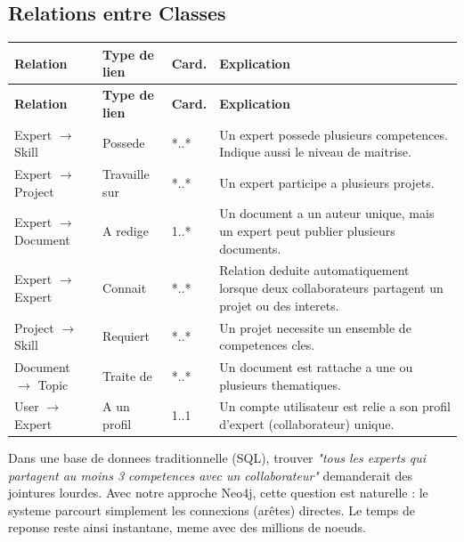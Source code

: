 \documentclass[12pt,a4paper]{article}
\begin{document}
\subsection{Relations entre Classes}

\begin{longtable}{|p{3.5cm}|p{3cm}|p{1.5cm}|p{5.5cm}|}
\toprule
\rowcolor{bleu!15}
\textbf{Relation} & \textbf{Type de lien} & \textbf{Card.} & \textbf{Explication} \\
\midrule
\endfirsthead
\toprule
\rowcolor{bleu!15}
\textbf{Relation} & \textbf{Type de lien} & \textbf{Card.} & \textbf{Explication} \\
\midrule
\endhead
Expert $\rightarrow$ Skill & Possede & *..* & Un expert possede plusieurs competences. Indique aussi le niveau de maitrise. \\
\midrule
Expert $\rightarrow$ Project & Travaille sur & *..* & Un expert participe a plusieurs projets. \\
\midrule
Expert $\rightarrow$ Document & A redige & 1..* & Un document a un auteur unique, mais un expert peut publier plusieurs documents. \\
\midrule
Expert $\rightarrow$ Expert & Connait & *..* & Relation deduite automatiquement lorsque deux collaborateurs partagent un projet ou des interets. \\
\midrule
Project $\rightarrow$ Skill & Requiert & *..* & Un projet necessite un ensemble de competences cles. \\
\midrule
Document $\rightarrow$ Topic & Traite de & *..* & Un document est rattache a une ou plusieurs thematiques. \\
\midrule
User $\rightarrow$ Expert & A un profil & 1..1 & Un compte utilisateur est relie a son profil d'expert (collaborateur) unique. \\
\bottomrule
\end{longtable}

\begin{tcolorbox}[colback=vertclair!10,colframe=vertclair,title=Pourquoi une base orientee graphe pour ces relations ?]
Dans une base de donnees traditionnelle (SQL), trouver \textit{"tous les experts qui partagent au moins 3 competences avec un collaborateur"} demanderait des jointures lourdes. Avec notre approche Neo4j, cette question est naturelle : le systeme parcourt simplement les connexions (arêtes) directes. Le temps de reponse reste ainsi instantane, meme avec des millions de noeuds.
\end{tcolorbox}
\end{document}
